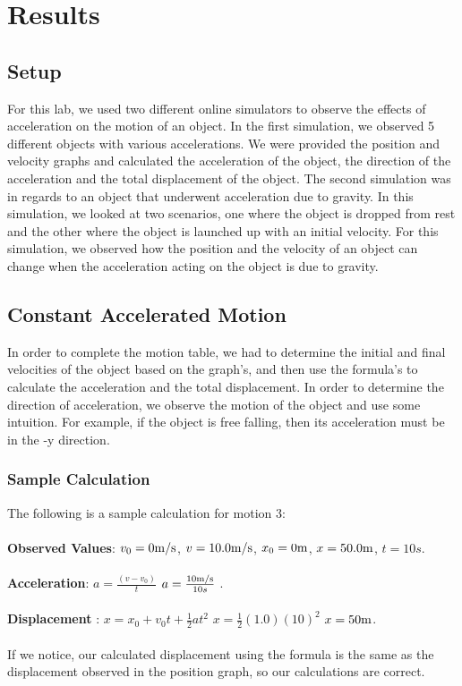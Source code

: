 \documentclass{article}
\begin{document}
\section{Results} 
\subsection{Setup}
For this lab, we used two different online simulators to observe the effects of acceleration on the motion of an object. In the first simulation, we observed 5 different objects with various accelerations. We were provided the position and velocity graphs and calculated the acceleration of the object, the direction of the acceleration and the total displacement of the object. The second simulation was in regards to an object that underwent acceleration due to gravity. In this simulation, we looked at two scenarios, one where the object is dropped from rest and the other where the object is launched up with an initial velocity. For this simulation, we observed how the position and the velocity of an object can change when the acceleration acting on the object is due to gravity. 
\subsection{Constant Accelerated Motion} 
In order to complete the motion table, we had to determine the initial and final velocities of the object based on the graph's, and then use the formula's to calculate the acceleration and the total displacement. In order to determine the direction of acceleration, we observe the motion of the object and use some intuition. For example, if the object is free falling, then its acceleration must be in the -y direction. 

\subsubsection{Sample Calculation} 
The following is a sample calculation for motion 3: \\ \\
\textbf{Observed Values}: \(v_0 = 0\si[per-mode=symbol]{\meter\per\second}\), \(v = 10.0\si[per-mode=symbol]{\meter\per\second}\), \(x_0 = 0\si[per-mode=symbol]{\meter}\), \(x=50.0\si[per-mode=symbol]{\meter}\), \(t=10s\). \\ \\ 
\textbf{Acceleration}: \(a = \frac{(v-v_0)}{t}\) \Rightarrow \(a = \frac{10\si[per-mode=symbol]{\meter\per\second}}{10s}\) . \\ \\ 
\textbf{Displacement} : \(x = x_0 + v_0t + \frac{1}{2}at^2\) \Rightarrow \(x = \frac{1}{2}(1.0)(10)^2\) \Rightarrow \(x = 50\si[per-mode=symbol]{\meter}\). \\ \\ 
If we notice, our calculated displacement using the formula is the same as the displacement observed in the position graph, so our calculations are correct. 
\end{document}
